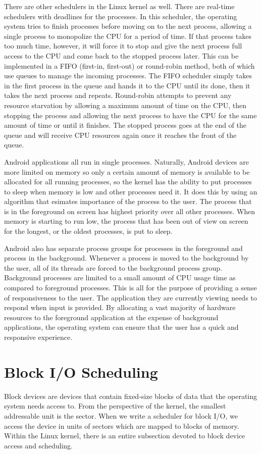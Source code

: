 \documentclass[a4paper]{article}
\begin{document}
There are other schedulers in the Linux kernel as well. There are real-time schedulers with deadlines for the processes. In this scheduler, the operating system tries to finish processes before moving on to the next process, allowing a single process to monopolize the CPU for a period of time. If that process takes too much time, however, it will force it to stop and give the next process full access to the CPU and come back to the stopped process later. This can be implemented in a FIFO (first-in, first-out) or round-robin method, both of which use queues to manage the incoming processes. The FIFO scheduler simply takes in the first process in the queue and hands it to the CPU until its done, then it takes the next process and repeats. Round-robin attempts to prevent any resource starvation by allowing a maximum amount of time on the CPU, then stopping the process and allowing the next process to have the CPU for the same amount of time or until it finishes. The stopped process goes at the end of the queue and will receive CPU resources again once it reaches the front of the queue.

Android applications all run in single processes. Naturally, Android devices are more limited on memory so only a certain amount of memory is available to be allocated for all running processes, so the kernel has the ability to put processes to sleep when memory is low and other processes need it. It does this by using an algorithm that esimates importance of the process to the user. The process that is in the foreground on screen has highest priority over all other processes. When memory is starting to run low, the process that has been out of view on screen for the longest, or the oldest processes, is put to sleep.

Android also has separate process groups for processes in the foreground and process in the background. Whenever a process is moved to the background by the user, all of its threads are forced to the background process group. Background processes are limited to a small amount of CPU usage time as compared to foreground processes. This is all for the purpose of providing a sense of responsiveness to the user. The application they are currently viewing needs to respond when input is provided. By allocating a vast majority of hardware resources to the foreground application at the expense of background applications, the operating system can ensure that the user has a quick and responsive experience. 


\section{Block I/O Scheduling}
Block devices are devices that contain fixed-size blocks of data that the operating system needs access to. From the perspective of the kernel, the smallest addressable unit is the sector. When we write a scheduler for block I/O, we access the device in units of sectors which are mapped to blocks of memory. Within the Linux kernel, there is an entire subsection devoted to block device access and scheduling. 
\end{document}
